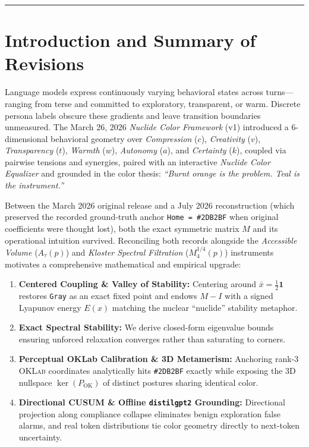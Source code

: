 \documentclass[11pt,letterpaper]{article}
\begin{document}
\noindent\rule{\linewidth}{0.4pt}

\section{Introduction and Summary of Revisions}

Language models express continuously varying behavioral states across turns---ranging from terse and committed to exploratory, transparent, or warm. Discrete persona labels obscure these gradients and leave transition boundaries unmeasured. The March 26, 2026 \emph{Nuclide Color Framework} (v1) introduced a 6-dimensional behavioral geometry over \emph{Compression} ($c$), \emph{Creativity} ($v$), \emph{Transparency} ($t$), \emph{Warmth} ($w$), \emph{Autonomy} ($a$), and \emph{Certainty} ($k$), coupled via pairwise tensions and synergies, paired with an interactive \emph{Nuclide Color Equalizer} and grounded in the color thesis: \emph{``Burnt orange is the problem. Teal is the instrument.''}

Between the March 2026 original release and a July 2026 reconstruction (which preserved the recorded ground-truth anchor \texttt{Home = \#2DB2BF} when original coefficients were thought lost), both the exact symmetric matrix $M$ and its operational intuition survived. Reconciling both records alongside the \emph{Accessible Volume} ($A_\tau(p)$) and \emph{Kloster Spectral Filtration} ($M_4^{1/4}(p)$) instruments motivates a comprehensive mathematical and empirical upgrade:
\begin{enumerate}
  \item \textbf{Centered Coupling \& Valley of Stability:} Centering around $\bar{x}=\tfrac{1}{2}\mathbf{1}$ restores \texttt{Gray} as an exact fixed point and endows $M-I$ with a signed Lyapunov energy $E(x)$ matching the nuclear ``nuclide'' stability metaphor.
  \item \textbf{Exact Spectral Stability:} We derive closed-form eigenvalue bounds ensuring unforced relaxation converges rather than saturating to corners.
  \item \textbf{Perceptual OKLab Calibration \& 3D Metamerism:} Anchoring rank-3 \textsc{OKLab} coordinates analytically hits \texttt{\#2DB2BF} exactly while exposing the 3D nullspace $\ker(P_{\mathrm{OK}})$ of distinct postures sharing identical color.
  \item \textbf{Directional CUSUM \& Offline \texttt{distilgpt2} Grounding:} Directional projection along compliance collapse eliminates benign exploration false alarms, and real token distributions tie color geometry directly to next-token uncertainty.
\end{enumerate}
\end{document}
